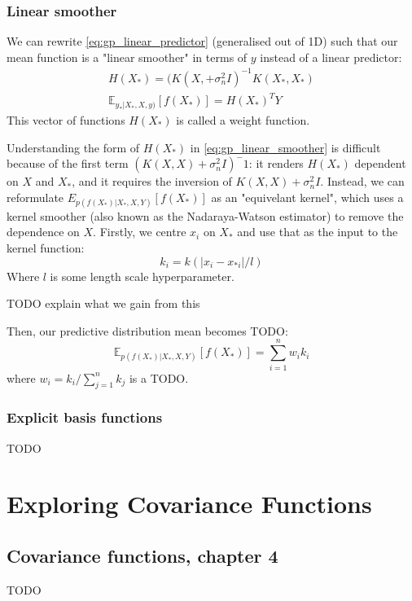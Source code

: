 \documentclass[10pt]{article}
\begin{document}
\subsubsection{Linear smoother}
We can rewrite \ref{eq:gp_linear_predictor} (generalised out of 1D) such that our mean function is a "linear smoother" in terms of $y$ instead of a linear predictor: 
\begin{equation} \label{eq:gp_linear_smoother}
    \begin{aligned}
        H(X_*) = (K(X, + \sigma^2_nI)^{-1}K(X_*,X_*) \\
        \mathbb{E}_{y_*|X_*,X,y)}[f(X_*)] = H(X_*)^T Y
    \end{aligned}
\end{equation}
This vector of functions $H(X_*)$ is called a weight function. 

Understanding the form of $H(X_*)$ in \ref{eq:gp_linear_smoother} is difficult because of the first term $(K(X, X) + \sigma_n^2I)^-1$: it renders $H(X_*)$ dependent on $X$ and $X_*$, and it requires the inversion of $K(X, X) + \sigma^2_nI$. Instead, we can reformulate $E_{p(f(X_*)|X_*,X,Y)}[f(X_*)]$ as an "equivelant kernel", which uses a kernel smoother (also known as the Nadaraya-Watson estimator) to remove the dependence on $X$. Firstly, we centre $x_i$ on $X_*$ and use that as the input to the kernel function:
\begin{equation*}
    k_i = k(|x_i - x_{*i}|/l)
\end{equation*}
Where $l$ is some length scale hyperparameter. 

TODO explain what we gain from this

Then, our predictive distribution mean becomes TODO:
\begin{equation*}
    \mathbb{E}_{p(f(X_*)|X_*,X,Y)}[f(X_*)] = \sum_{i=1}^n w_i k_i
\end{equation*}
where $w_i = k_i / \sum_{j=1}^n k_j$ is a TODO.


\subsubsection{Explicit basis functions}
TODO

\section{Exploring Covariance Functions}


\subsection{Covariance functions, chapter 4 \cite{gp-ml}}
TODO
\end{document}
